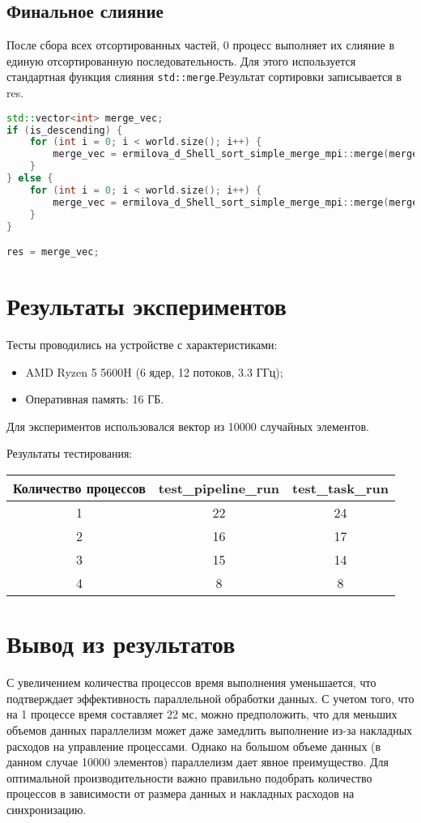 \documentclass[a4paper,12pt]{article}
\begin{document}
\subsection{Финальное слияние}
После сбора всех отсортированных частей, 0 процесс выполняет их слияние в единую отсортированную последовательность. Для этого используется стандартная функция слияния  \texttt{std::merge}.Результат сортировки записывается в res.
\begin{lstlisting}[language=C++,caption={Финальное слияние}]
std::vector<int> merge_vec;
if (is_descending) {
    for (int i = 0; i < world.size(); i++) {
        merge_vec = ermilova_d_Shell_sort_simple_merge_mpi::merge(merge_vec, sorted_inputs[i], std::greater());
    }
} else {
    for (int i = 0; i < world.size(); i++) {
        merge_vec = ermilova_d_Shell_sort_simple_merge_mpi::merge(merge_vec, sorted_inputs[i], std::less());
    }
}

res = merge_vec;
\end{lstlisting}
\newpage

\section{Результаты экспериментов}
Тесты проводились на устройстве с характеристиками:
\begin{itemize}
    \item AMD Ryzen 5 5600H (6 ядер, 12 потоков, 3.3 ГГц);
    \item Оперативная память: 16 ГБ.
\end{itemize}

Для экспериментов использовался вектор из 10000 случайных элементов.

Результаты тестирования:
\begin{center}
    \begin{tabular}{|c|c|c|}
    \hline
    Количество процессов & test\_pipeline\_run & test\_task\_run \\
    \hline
    1 & 22 & 24 \\
    2 & 16 & 17 \\
    3 & 15 & 14 \\
    4 & 8 & 8 \\
    \hline
    \end{tabular}
\end{center}
\newpage

\section{Вывод из результатов}
С увеличением количества процессов время выполнения уменьшается, что подтверждает эффективность параллельной обработки данных.
С учетом того, что на 1 процессе время составляет 22 мс, можно предположить, что для меньших объемов данных параллелизм может даже замедлить выполнение из-за накладных расходов на управление процессами. Однако на большом объеме данных (в данном случае 10000 элементов) параллелизм дает явное преимущество.
Для оптимальной производительности важно правильно подобрать количество процессов в зависимости от размера данных и накладных расходов на синхронизацию.
\newpage
\end{document}
